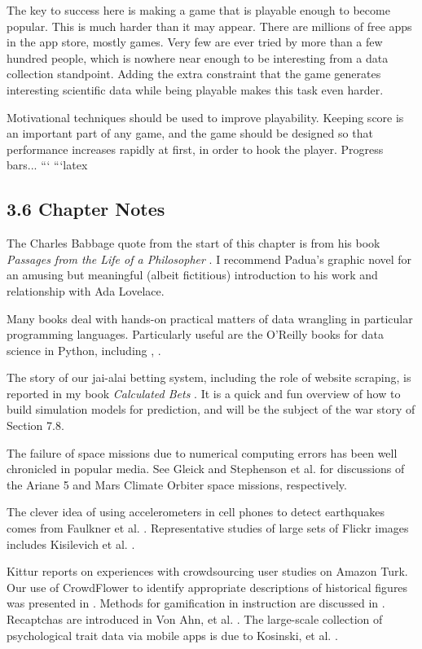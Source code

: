 \documentclass[10pt]{article}
\begin{document}
The key to success here is making a game that is playable enough to become popular. This is much harder than it may appear. There are millions of free apps in the app store, mostly games. Very few are ever tried by more than a few hundred people, which is nowhere near enough to be interesting from a data collection standpoint. Adding the extra constraint that the game generates interesting scientific data while being playable makes this task even harder.

Motivational techniques should be used to improve playability. Keeping score is an important part of any game, and the game should be designed so that performance increases rapidly at first, in order to hook the player. Progress bars...
```
```latex
\subsection*{3.6 Chapter Notes}
The Charles Babbage quote from the start of this chapter is from his book \textit{Passages from the Life of a Philosopher} \cite{Bab11}. I recommend Padua's graphic novel \cite{Pad15} for an amusing but meaningful (albeit fictitious) introduction to his work and relationship with Ada Lovelace.

Many books deal with hands-on practical matters of data wrangling in particular programming languages. Particularly useful are the O'Reilly books for data science in Python, including \cite{Gru15}, \cite{McK12}.

The story of our jai-alai betting system, including the role of website scraping, is reported in my book \textit{Calculated Bets} \cite{Ski01}. It is a quick and fun overview of how to build simulation models for prediction, and will be the subject of the war story of Section 7.8.

The failure of space missions due to numerical computing errors has been well chronicled in popular media. See Gleick \cite{Gle96} and Stephenson et al. \cite{SMB+99} for discussions of the Ariane 5 and Mars Climate Orbiter space missions, respectively.

The clever idea of using accelerometers in cell phones to detect earthquakes comes from Faulkner et al. \cite{FCH+14}. Representative studies of large sets of Flickr images includes Kisilevich et al. \cite{KKK+10}.

Kittur \cite{KCS08} reports on experiences with crowdsourcing user studies on Amazon Turk. Our use of CrowdFlower to identify appropriate descriptions of historical figures was presented in \cite{CPS15}. Methods for gamification in instruction are discussed in \cite{DDKN11, Kap12}. Recaptchas are introduced in Von Ahn, et al. \cite{VAMM+08}. The large-scale collection of psychological trait data via mobile apps is due to Kosinski, et al. \cite{KSG13}.
\end{document}
